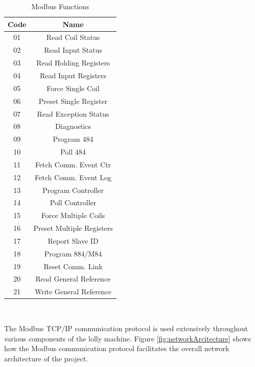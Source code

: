     \begin{table}[H]
        \caption{Modbus Functions}
        \begin{center}
            \begin{tabular}{ |c|c| }
                \hline
                \textbf{Code} & \textbf{Name}\\ 
                \hline
                01 & Read Coil Status\\
                02 & Read Input Status\\
                03 & Read Holding Registers\\
                04 & Read Input Registers\\
                05 & Force Single Coil\\
                06 & Preset Single Register\\
                07 & Read Exception Status\\
                08 & Diagnostics\\
                09 & Program 484\\
                10 & Poll 484\\
                11 & Fetch Comm. Event Ctr\\
                12 & Fetch Comm. Event Log\\
                13 & Program Controller\\
                14 & Poll Controller\\
                15 & Force Multiple Coils\\
                16 & Preset Multiple Registers\\
                17 & Report Slave ID\\
                18 & Program 884/M84\\
                19 & Reset Comm. Link\\
                20 & Read General Reference\\
                21 & Write General Reference\\
                \hline
            \end{tabular}\\
        \end{center}
        \label{table:modbusFunctions}
    \end{table}

The Modbus TCP/IP communication protocol is used extensively throughout various components of the lolly machine. Figure \ref{fig:networkArcitecture} shows how the Modbus communication protocol facilitates the overall network architecture of the project.
